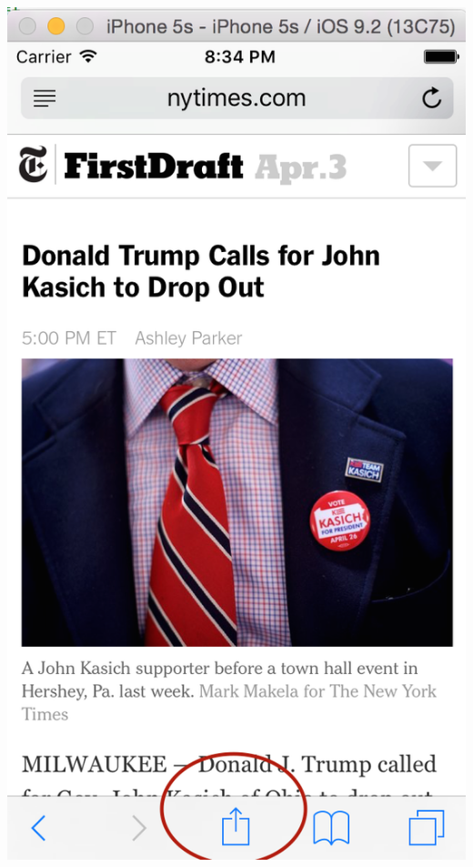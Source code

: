 \documentclass[11pt, margin=1in]{article}
\begin{document}
\begin{center}
\includegraphics[scale=0.5]{10.jpg}

\end{center}
\end{document}
